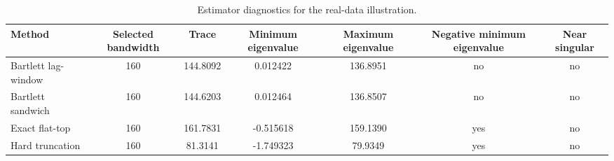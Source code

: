 \begin{table}[!htbp]
\centering
\small
\caption{Estimator diagnostics for the real-data illustration.}
\label{tab:real-estimator-diagnostics}
\begin{tabular}{lcccccc}
\toprule
Method & Selected bandwidth & Trace & Minimum eigenvalue & Maximum eigenvalue & Negative minimum eigenvalue & Near singular
 \\
\midrule
Bartlett lag-window & 160 & 144.8092 & 0.012422 & 136.8951 & no & no
 \\
Bartlett sandwich & 160 & 144.6203 & 0.012464 & 136.8507 & no & no
 \\
Exact flat-top & 160 & 161.7831 & -0.515618 & 159.1390 & yes & no
 \\
Hard truncation & 160 & 81.3141 & -1.749323 & 79.9349 & yes & no
 \\
\bottomrule
\end{tabular}
\end{table}

